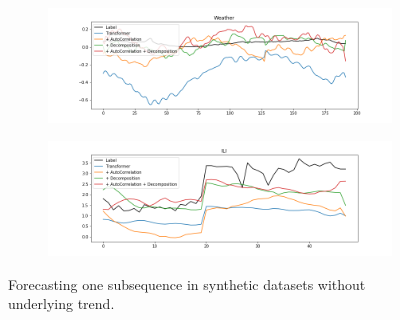 \begin{figure}[ht]
\begin{subfigure}{0.6\textwidth}
    \end{subfigure}
    \begin{subfigure}{0.6\textwidth}
        \includegraphics[width=\textwidth]{img/pred_Weather.png}
    \end{subfigure}
    \begin{subfigure}{0.6\textwidth}
        \includegraphics[width=\textwidth]{img/pred_ILI.png}
    \end{subfigure}
    \caption{Forecasting one subsequence in synthetic datasets without underlying trend.}
\end{figure}
\clearpage


